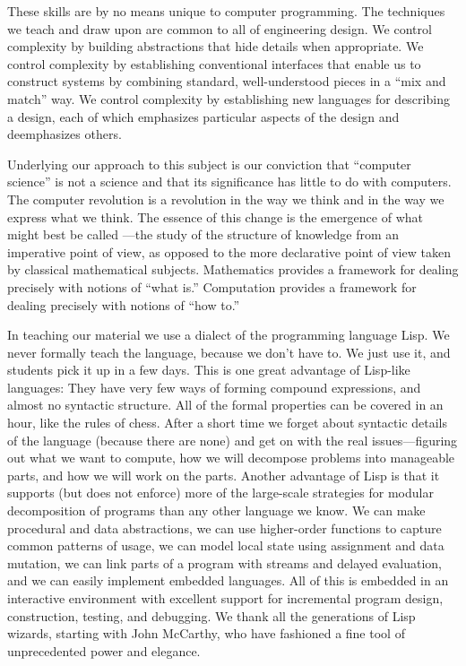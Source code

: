 These skills are by no means unique to computer programming.
The techniques we teach and draw upon are common to all of engineering design.
We control complexity by building abstractions that hide details when appropriate.
We control complexity by establishing conventional interfaces that enable us to construct systems by combining standard, well-understood pieces in a “mix and match” way.
We control complexity by establishing new languages for describing a design, each of which emphasizes particular aspects of the design and deemphasizes others.

Underlying our approach to this subject is our conviction that “computer science” is not a science and that its significance has little to do with computers.
The computer revolution is a revolution in the way we think and in the way we express what we think.
The essence of this change is the emergence of what might best be called ---the study of the structure of knowledge from an imperative point of view, as opposed to the more declarative point of view taken by classical mathematical subjects.
Mathematics provides a framework for dealing precisely with notions of “what is.”
Computation provides a framework for dealing precisely with notions of “how to.”

In teaching our material we use a dialect of the programming language Lisp.
We never formally teach the language, because we don’t have to.
We just use it, and students pick it up in a few days.
This is one great advantage of Lisp-like languages:
They have very few ways of forming compound expressions, and almost no syntactic structure.
All of the formal properties can be covered in an hour, like the rules of chess.
After a short time we forget about syntactic details of the language (because there are none) and get on with the real issues---figuring out what we want to compute, how we will decompose problems into manageable parts, and how we will work on the parts.
Another advantage of Lisp is that it supports (but does not enforce) more of the large-scale strategies for modular decomposition of programs than any other language we know.
We can make procedural and data abstractions, we can use higher-order functions to capture common patterns of usage, we can model local state using assignment and data mutation, we can link parts of a program with streams and delayed evaluation, and we can easily implement embedded languages.
All of this is embedded in an interactive environment with excellent support for incremental program design, construction, testing, and debugging.
We thank all the generations of Lisp wizards, starting with John McCarthy, who have fashioned a fine tool of unprecedented power and elegance.

